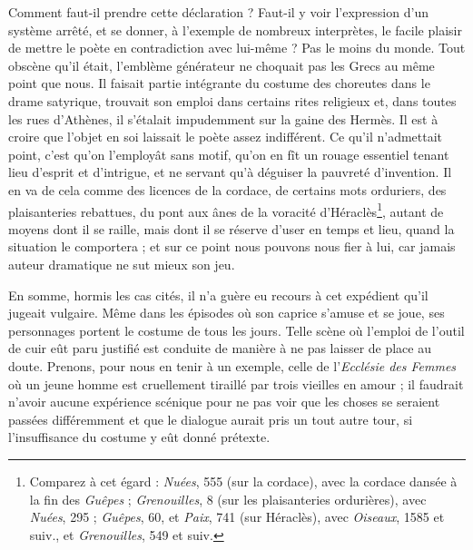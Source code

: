 \documentclass{book}%
\newcommand{\italique}[1]{\textit{#1}}%
\newcommand{\note}[1]{\footnote{#1}}
\begin{document}
Comment faut-il prendre cette déclaration ? Faut-il y voir l'expression d'un système arrêté, et se donner, à l'exemple de nombreux interprètes, le facile plaisir de mettre le poète en contradiction avec lui-même ? Pas le moins du monde. Tout obscène qu'il était, l'emblème générateur ne choquait pas les Grecs au même point que nous. Il faisait partie intégrante du costume des choreutes dans le drame satyrique, trouvait son emploi dans certains rites religieux et, dans toutes les rues d'Athènes, il s'étalait impudemment sur la gaine des Hermès. Il est à croire que l'objet en soi laissait le poète assez indifférent. Ce qu'il n'admettait point, c'est qu'on l'employât sans motif, qu'on en fît un rouage essentiel tenant lieu d'esprit et d'intrigue, et ne servant qu'à déguiser la pauvreté d'invention. Il en va de cela comme des licences de la cordace, de certains mots orduriers, des plaisanteries rebattues, du pont aux ânes de la voracité d'Héraclès\note{Comparez à cet égard : \italique{Nuées}, 555 (sur la cordace), avec la cordace dansée à la fin des \italique{Guêpes} ; \italique{Grenouilles}, 8 (sur les plaisanteries ordurières), avec \italique{Nuées}, 295 ; \italique{Guêpes}, 60, et \italique{Paix}, 741 (sur Héraclès), avec \italique{Oiseaux}, 1585 et suiv., et \italique{Grenouilles}, 549 et suiv.}, autant de moyens dont il se raille, mais dont il se réserve d'user en temps et lieu, quand la situation le comportera ; et sur ce point nous pouvons nous fier à lui, car jamais auteur dramatique ne sut mieux son jeu. 

En somme, hormis les cas cités, il n'a guère eu recours à cet expédient qu'il jugeait vulgaire. Même dans les épisodes où son caprice s'amuse et se joue, ses personnages portent le costume de tous les jours. Telle scène où l'emploi de l'outil de cuir eût paru justifié est conduite de manière à ne pas laisser de place au doute. Prenons, pour nous en tenir à un exemple, celle de l'\italique{Ecclésie des Femmes} où un jeune homme est cruellement tiraillé par trois vieilles en amour ; il faudrait n'avoir aucune expérience scénique pour ne pas voir que les choses se seraient passées différemment et que le dialogue aurait pris un tout autre tour, si l'insuffisance du costume y eût donné prétexte. 
\end{document}
